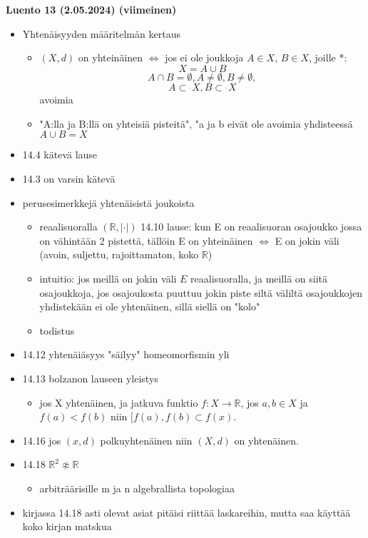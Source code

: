 \documentclass[12pt,a4paper,leqno]{amsart}
\newcommand{\oss}{\operatorname{\subset\!\!\!\!_{^{^\circ}}}}
\newcommand{\re}{\mathbb{R}}
\begin{document}
\textbf{Luento 13 (2.05.2024) (viimeinen)}
\begin{itemize}
    \item Yhtenäisyyden määritelmän kertaus
    \begin{itemize}
        \item $(X, d)$ on yhteinäinen $\iff$ jos ei ole joukkoja $A \in X$, $B \in X$, joille *:\[X = A \cup B \] \[A \cap B = \emptyset, A \neq \emptyset, B \neq \emptyset,\] \[A \oss X, B \oss X\] avoimia
        \item "A:lla ja B:llä on yhteisiä pisteitä", "a ja b eivät ole avoimia yhdisteessä $A \cup B = X$
    \end{itemize}
    \item 14.4 kätevä lause
    \item 14.3 on varsin kätevä
    \item perusesimerkkejä yhtenäisistä joukoista
    \begin{itemize}
        \item reaalisuoralla $(\mathbb{R}, |\cdot|)$ 14.10 lause: kun E on reaalisuoran osajoukko jossa on vähintään 2 pistettä, tällöin E on yhteinäinen $\iff$ E on jokin väli (avoin, suljettu, rajoittamaton, koko $\mathbb{R}$)
            \item intuitio: jos meillä on jokin väli $E$ reaalisuoralla, ja meillä on siitä osajoukkoja, jos osajoukosta puuttuu jokin piste siltä väliltä osajoukkojen yhdistekään ei ole  yhtenäinen, sillä siellä on "kolo"
            \item todistus
        \end{itemize}
        \item 14.12 yhtenäiäsyys "säilyy" homeomorfismin yli
        \item 14.13 bolzanon lauseen yleistys
        \begin{itemize}
            \item jos X yhtenäinen, ja jatkuva funktio $f: X \to \re$, jos $a, b \in X$ ja $f(a) < f(b)$ niin $[f(a), f(b) \subset f(x)$.
        \end{itemize}
    \item 14.16 jos $(x, d)$ polkuyhtenäinen niin $(X, d)$ on yhtenäinen.
    \item 14.18 $\re^2 \not \approx \re$
    \begin{itemize}
        \item arbiträärisille m ja n algebrallista topologiaa
    \end{itemize}
    \item kirjassa 14.18 asti olevat asiat pitäisi riittää laskareihin, mutta saa käyttää koko kirjan matskua
    \end{itemize}
\end{document}
